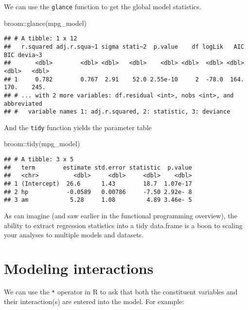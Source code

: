 \documentclass[
]{book}
\newenvironment{Shaded}{\begin{snugshade}}{\end{snugshade}}
\newcommand{\FunctionTok}[1]{\textcolor[rgb]{0.00,0.00,0.00}{#1}}
\newcommand{\NormalTok}[1]{#1}
\newcommand{\SpecialCharTok}[1]{\textcolor[rgb]{0.00,0.00,0.00}{#1}}
\begin{document}
We can use the \texttt{glance} function to get the global model statistics.

\begin{Shaded}
\begin{Highlighting}[]
\NormalTok{broom}\SpecialCharTok{::}\FunctionTok{glance}\NormalTok{(mpg\_model)}
\end{Highlighting}
\end{Shaded}

\begin{verbatim}
## # A tibble: 1 x 12
##   r.squared adj.r.squa~1 sigma stati~2  p.value    df logLik   AIC   BIC devia~3
##       <dbl>        <dbl> <dbl>   <dbl>    <dbl> <dbl>  <dbl> <dbl> <dbl>   <dbl>
## 1     0.782        0.767  2.91    52.0 2.55e-10     2  -78.0  164.  170.    245.
## # ... with 2 more variables: df.residual <int>, nobs <int>, and abbreviated
## #   variable names 1: adj.r.squared, 2: statistic, 3: deviance
\end{verbatim}

And the \texttt{tidy} function yields the parameter table

\begin{Shaded}
\begin{Highlighting}[]
\NormalTok{broom}\SpecialCharTok{::}\FunctionTok{tidy}\NormalTok{(mpg\_model)}
\end{Highlighting}
\end{Shaded}

\begin{verbatim}
## # A tibble: 3 x 5
##   term        estimate std.error statistic  p.value
##   <chr>          <dbl>     <dbl>     <dbl>    <dbl>
## 1 (Intercept)  26.6      1.43        18.7  1.07e-17
## 2 hp           -0.0589   0.00786     -7.50 2.92e- 8
## 3 am            5.28     1.08         4.89 3.46e- 5
\end{verbatim}

As can imagine (and saw earlier in the functional programming overview), the ability to extract regression statistics into a tidy data.frame is a boon to scaling your analyses to multiple models and datasets.

\hypertarget{modeling-interactions}{%
\section{Modeling interactions}\label{modeling-interactions}}

We can use the \texttt{*} operator in R to ask that both the constituent variables and their interaction(s) are entered into the model. For example:
\end{document}

